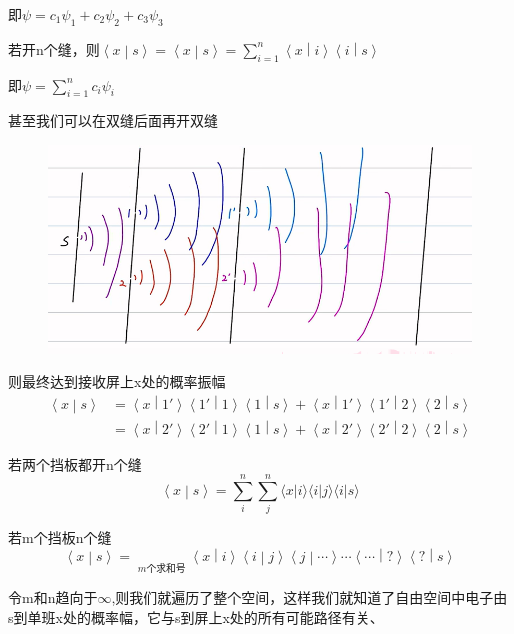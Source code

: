 \documentclass[lang=cn,10pt]{elegantbook}
\begin{document}
即$\psi=c_1\psi_1+c_2\psi_2+c_3\psi_3$

若开n个缝，则$\left< x \middle| s \right>=\left< x \middle| s \right> =\sum_{i=1}^n{\left< x \middle| i \right> \left< i \middle| s \right>}
$

即$\psi=\sum_{i=1}^n{c_i\psi_i}$

甚至我们可以在双缝后面再开双缝
\begin{figure}[H]
	\centering
	\includegraphics[width=0.7\linewidth]{figure/screenshot009}
\end{figure}

则最终达到接收屏上x处的概率振幅
\begin{equation}
	\begin{split}
		\left< x \middle| s \right> &=\left< x \middle| 1 '\right> \left< 1' \middle| 1 \right> \left< 1 \middle| s \right> +\left< x \middle| 1' \right> \left< 1' \middle| 2 \right> \left< 2 \middle| s \right> 
		\\
		&=\left< x \middle| 2 '\right> \left< 2' \middle| 1 \right> \left< 1 \middle| s \right> +\left< x \middle| 2' \right> \left< 2' \middle| 2 \right> \left< 2 \middle| s \right> 
	\end{split}
\end{equation}

若两个挡板都开n个缝
\begin{equation}
	\left< x \middle| s \right> =\sum_i^n{\sum_j^n{\langle x|i\rangle \langle i|j\rangle \langle i|s\rangle}}
\end{equation}

若m个挡板n个缝
\begin{equation}
	\left< x \middle| s \right> =\mathop {\underbrace{\sum_i^n{\sum_j^n{\sum_k^n{\cdots \sum_?^n{}}}}}} \limits_{m\text{个求和号}}\left< x \middle| i \right> \left< i \middle| j \right> \left< j \middle| \cdots \right> \cdots \left< \cdots \middle| ? \right> \left< ? \middle| s \right> 
\end{equation}

令m和n趋向于$\infty$,则我们就遍历了整个空间，这样我们就知道了自由空间中电子由s到单班x处的概率幅，它与s到屏上x处的所有可能路径有关、
\end{document}
